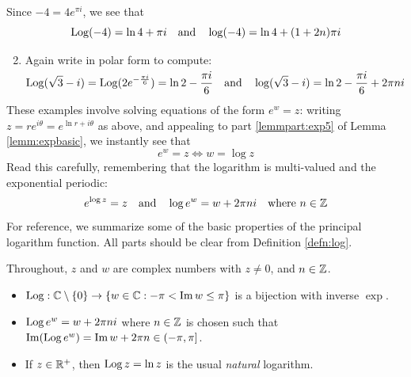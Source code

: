 
\begin{examples}{}{}
	\exstart Since $-4=4e^{\pi i}$, we see that
	\[
		\operatorname{Log}(-4)=\ln 4+\pi i\quad\text{and}\quad \log(-4)=\ln 4+(1+2n)\pi i\]
	\begin{enumerate}\setcounter{enumi}{1}
		\item Again write in polar form to compute:
		\[
			\operatorname{Log}(\sqrt 3-i)=\operatorname{Log}(2e^{-\frac{\pi i}{6}})=\ln 2-\smash{\frac{\pi i}6}\quad\text{and}\quad \log (\sqrt 3-i)=\ln 2-\smash{\frac{\pi i}6}+2\pi ni
		\]
	\end{enumerate}
\end{examples}

These examples involve solving equations of the form $e^w=z$: writing $z=re^{i\theta}=e^{\ln r+i\theta}$ as above, and appealing to part \ref{lemmpart:exp5} of Lemma \ref*{lemm:expbasic}, we instantly see that
\[
	e^w=z\iff w=\log z
\]
Read this carefully, remembering that the logarithm is multi-valued and the exponential periodic:
\[
	e^{\log z}=z
	\quad\text{and}\quad
	\log e^w=w+2\pi ni\quad\text{where $n\in\mathbb{Z}$}
\]
For reference, we summarize some of the basic properties of the principal logarithm function. All parts should be clear from Definition \ref{defn:log}.


\begin{lemm}{}{}
	Throughout, $z$ and $w$ are complex numbers with $z\neq 0$, and $n\in\mathbb{Z}$.
	\begin{itemize}
	  \item $\operatorname{Log}:\mathbb{C}\setminus\{0\}\to \{w\in\mathbb{C}:-\pi <\operatorname{Im} w\le\pi\}$ is a bijection with inverse $\exp$.
	  \item $\operatorname{Log} e^w=w+2\pi ni$ where $n\in\mathbb{Z}$ is chosen such that $\operatorname{Im}(\operatorname{Log} e^w)=\operatorname{Im} w+2\pi n\in(-\pi,\pi]$.
	  \item If $z\in\mathbb{R}^+$, then $\operatorname{Log} z=\ln z$ is the usual \emph{natural} logarithm.
	\end{itemize}
\end{lemm}


\goodbreak

\label{sec:loglaws}

